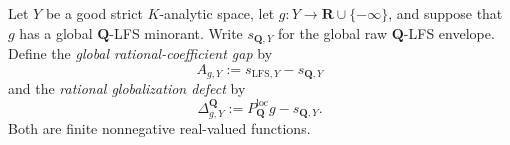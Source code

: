 
\begin{definition}
\label{def:p031-rational-globalization-ledger}
Let $Y$ be a good strict $K$-analytic space, let
$g:Y\to\mathbf R\cup\{-\infty\}$, and suppose that $g$ has a global
$\mathbf Q$-LFS minorant.  Write $s_{\mathbf Q,Y}$ for the global raw
$\mathbf Q$-LFS envelope.  Define the \emph{global rational-coefficient
gap} by
\begin{equation}
\label{eq:p031-rational-lfs-global-gap}
 A_{g,Y}:=s_{\mathrm{LFS},Y}-s_{\mathbf Q,Y}
\end{equation}
and the \emph{rational globalization defect} by
\begin{equation}
\label{eq:p031-rational-globalization-defect}
 \Delta^{\mathbf Q}_{g,Y}
   :=P_{\mathbf Q}^{\mathrm{loc}}g-s_{\mathbf Q,Y}.
\end{equation}
Both are finite nonnegative real-valued functions.
\end{definition}

